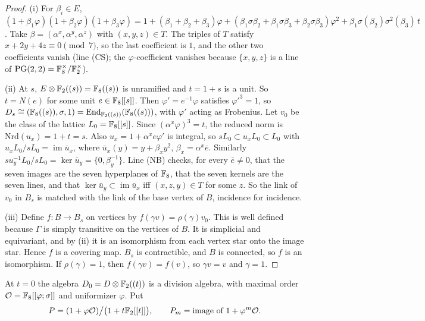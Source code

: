 \begin{proof}
(i) For $\beta_i\in E$,
$(1+\beta_1\varphi)(1+\beta_2\varphi)(1+\beta_3\varphi)=1+(\beta_1+\beta_2+\beta_3)\varphi
+(\beta_1\sigma\beta_2+\beta_1\sigma\beta_3+\beta_2\sigma\beta_3)\varphi^{2}
+\beta_1\sigma(\beta_2)\sigma^{2}(\beta_3)\,t$. Take $\beta=(\alpha^{x},\alpha^{y},\alpha^{z})$ with
$(x,y,z)\in T$. The triples of $T$ satisfy $x+2y+4z\equiv0\pmod7$, so the last coefficient is
$1$, and the other two coefficients vanish (line (CS); the $\varphi$-coefficient vanishes
because $\{x,y,z\}$ is a line of $\mathrm{PG}(2,2)=\mathbb{F}_8^{\times}/\mathbb{F}_2^{\times}$).

(ii) At $s$, $E\otimes\mathbb{F}_2((s))=\mathbb{F}_8((s))$ is unramified and $t=1+s$ is a unit. So $t=N(e)$ for
some unit $e\in\mathbb{F}_8[[s]]$. Then $\varphi'=e^{-1}\varphi$ satisfies $\varphi'^{3}=1$, so
$D_s\cong(\mathbb{F}_8((s)),\sigma,1)=\operatorname{End}_{\mathbb{F}_2((s))}(\mathbb{F}_8((s)))$, with $\varphi'$ acting as
Frobenius. Let $v_0$ be the class of the lattice $L_0=\mathbb{F}_8[[s]]$. Since
$(\alpha^{x}\varphi)^{3}=t$, the reduced norm is $\mathrm{Nrd}(u_x)=1+t=s$. Also
$u_x=1+\alpha^{x}e\varphi'$ is integral, so $sL_0\subset u_xL_0\subset L_0$ with
$u_xL_0/sL_0=\operatorname{im}\bar u_x$, where $\bar u_x(y)=y+\beta_xy^{2}$,
$\beta_x=\alpha^{x}\bar e$. Similarly $su_y^{-1}L_0/sL_0=\ker\bar u_y=\{0,\beta_y^{-1}\}$. Line (NB)
checks, for every $\bar e\ne0$, that the seven images are the seven hyperplanes of $\mathbb{F}_8$, that the
seven kernels are the seven lines, and that $\ker\bar u_y\subset\operatorname{im}\bar u_x$ iff
$(x,z,y)\in T$ for some $z$. So the link of $v_0$ in $B_s$ is matched with the link of the base
vertex of $B$, incidence for incidence.

(iii) Define $f\colon B\to B_s$ on vertices by $f(\gamma v)=\rho(\gamma)v_0$. This is well defined
because $\Gamma$ is simply transitive on the vertices of $B$. It is simplicial and equivariant,
and by (ii) it is an isomorphism from each vertex star onto the image star. Hence $f$ is a
covering map. $B_s$ is contractible, and $B$ is connected, so $f$ is an isomorphism. If
$\rho(\gamma)=1$, then $f(\gamma v)=f(v)$, so $\gamma v=v$ and $\gamma=1$.
\end{proof}

At $t=0$ the algebra $D_0=D\otimes\mathbb{F}_2((t))$ is a division algebra, with maximal order
$\mathcal O=\mathbb{F}_8[[\varphi;\sigma]]$ and uniformizer $\varphi$. Put
\[
P=(1+\varphi\mathcal O)\big/\bigl(1+t\mathbb{F}_2[[t]]\bigr),\qquad P_m=\text{image of }1+\varphi^{m}\mathcal O .
\]

